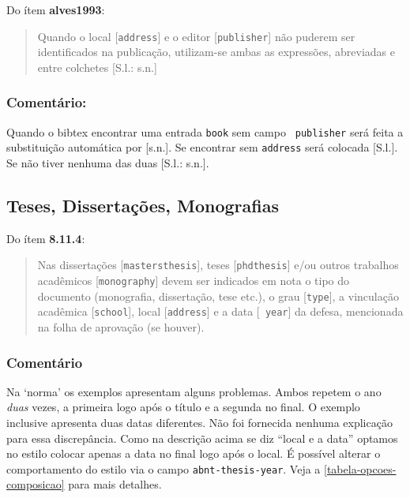 \documentclass[a4paper]{ltxdoc}
\begin{document}
Do ítem \textbf{alves1993}\cite{NBR6023:2000}:
\begin{quote}
Quando o local [\texttt{address}] e o editor [\texttt{publisher}] não puderem ser
identificados na publicação, utilizam-se ambas as expressões, abreviadas e
entre colchetes [S.l.: s.n.]
\end{quote}

\subsubsection{Comentário:}
Quando o \textsf{bibtex} encontrar uma entrada \texttt{book} sem campo \texttt{
publisher} será feita a substituição automática por [s.n.].
\cite{franco1993}
Se encontrar sem \texttt{address} será colocada [S.l.]. \cite{libris1981,krieger1992}
Se não tiver nenhuma das duas [S.l.: s.n.]. \cite{alves1993}

\subsection{Teses, Dissertações, Monografias}
\label{sec-teses}

Do ítem \textbf{8.11.4}\cite{NBR6023:2000}:
\begin{quote}
Nas dissertações [\texttt{mastersthesis}], teses [\texttt{phdthesis}] e/ou outros
trabalhos acadêmicos [\texttt{monography}] devem ser indicados em nota o tipo do
documento (monografia, dissertação, tese etc.), o grau [\texttt{type}], a
vinculação acadêmica [\texttt{school}], local [\texttt{address}] e a data [\texttt{
year}] da defesa, mencionada na folha de aprovação (se houver).
\cite{morgado1990,araujo1986,morgadob1990,morgadoc1990}
\end{quote}

\subsubsection{Comentário}
Na `norma' os exemplos  apresentam alguns
problemas. Ambos repetem o ano \emph{duas} vezes, a primeira logo após o título
e a segunda no final. O exemplo  inclusive apresenta
duas datas diferentes. Não foi fornecida nenhuma explicação para essa
discrepância. Como na descrição acima se diz ``local e a data'' optamos no
estilo colocar apenas a data no final logo após o local. É possível alterar o
comportamento do estilo via o campo \texttt{abnt-thesis-year}. Veja a
\autoref{tabela-opcoes-composicao} para mais detalhes.
\end{document}
